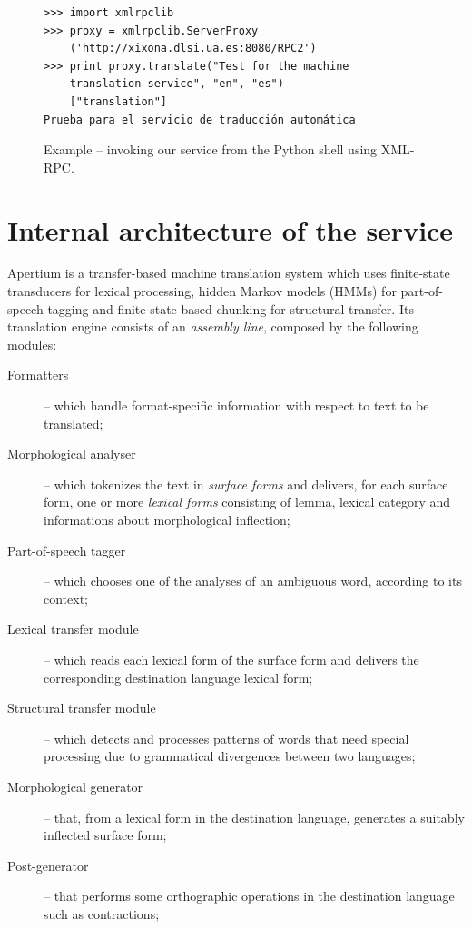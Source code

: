 \documentclass[11pt]{article}
\begin{document}
\begin{figure}
 \begin{Verbatim}[frame=single, fontfamily=courier, fontsize=\scriptsize]
>>> import xmlrpclib
>>> proxy = xmlrpclib.ServerProxy
	('http://xixona.dlsi.ua.es:8080/RPC2')
>>> print proxy.translate("Test for the machine 
	translation service", "en", "es")
	["translation"]
Prueba para el servicio de traducción automática
 \end{Verbatim}
 \caption{Example -- invoking our service from the Python shell using XML-RPC.}
 \label{fig:pythoninv}
\end{figure}

\section{Internal architecture of the service}

Apertium is a transfer-based machine translation system which uses finite-state transducers for lexical processing, hidden Markov models (HMMs) for part-of-speech tagging and finite-state-based chunking for structural transfer. Its translation engine consists of an \emph{assembly line}, composed by the following modules:

\begin{description}
 \item[Formatters] -- which handle format-specific information with respect to text to be translated;
 \item[Morphological analyser] -- which tokenizes the text in \emph{surface forms} and delivers, for each surface form, one or more \emph{lexical forms} consisting of lemma, lexical category and informations about morphological inflection;
 \item[Part-of-speech tagger] -- which chooses one of the analyses of an ambiguous word, according to its context;
 \item[Lexical transfer module] -- which reads each lexical form of the surface form and delivers the corresponding destination language lexical form;
 \item[Structural transfer module] -- which detects and processes patterns of words that need special processing due to grammatical divergences between two languages;
 \item[Morphological generator] -- that, from a lexical form in the destination language, generates a suitably inflected surface form;
 \item[Post-generator] -- that performs some orthographic operations in the destination language such as contractions;
\end{description}
\end{document}
